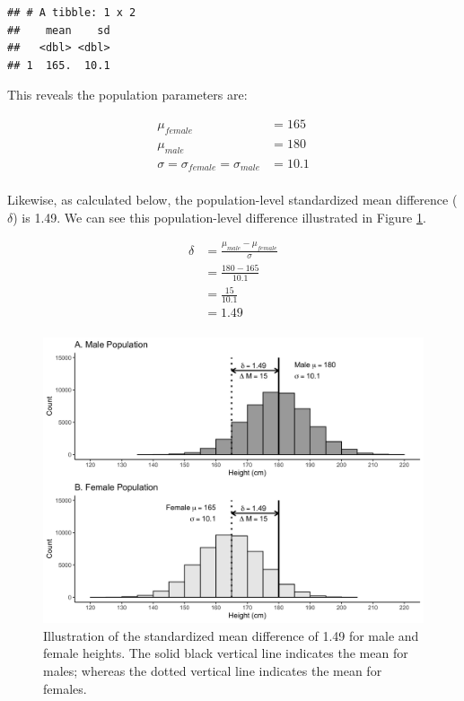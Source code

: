 \documentclass[
]{krantz}
\begin{document}
\begin{verbatim}
## # A tibble: 1 x 2
##    mean    sd
##   <dbl> <dbl>
## 1  165.  10.1
\end{verbatim}

This reveals the population parameters are:

\[
\begin{aligned} 
\mu_{female} &= 165 \\
\mu_{male} &= 180 \\
\sigma = \sigma_{female} = \sigma_{male} &= 10.1\\
\end{aligned} 
\]

Likewise, as calculated below, the population-level standardized mean difference (\(\delta\)) is 1.49. We can see this population-level difference illustrated in Figure \ref{fig:sexpop}.

\[
\begin{aligned} 
\delta  &= \frac{\mu_{male} - \mu_{female}}{\sigma} \\
&= \frac{180 - 165}{10.1} \\
&= \frac{15}{10.1} \\
&= 1.49 \\
\end{aligned} 
\]

\begin{figure}
\includegraphics[width=0.95\linewidth]{ch_samples/images/sex_pops} \caption[Illustration of standardized mean difference of $\delta =1.49$]{Illustration of the standardized mean difference of 1.49 for male and female heights. The solid black vertical line indicates the mean for males; whereas the dotted vertical line indicates the mean for females.}\label{fig:sexpop}
\end{figure}
\end{document}
